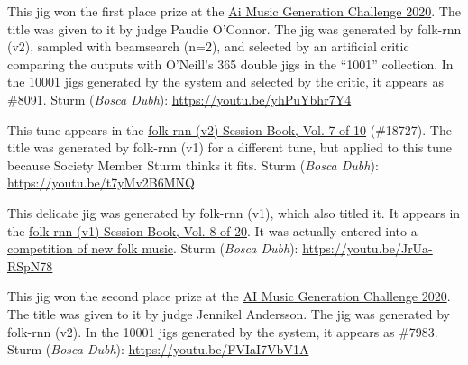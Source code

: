 \documentclass[a4paper,notitlepage,twoside]{book}
\begin{document}
{}
  
\hypertarget{jig:Aiman}{}
This jig won the first place prize at the 
\href{https://highnoongmt.wordpress.com/2020/11/20/the-ai-music-generation-challenge-2020-summary-and-results/}{Ai Music Generation Challenge 2020}.
The title was given to it by judge Paudie O'Connor.
The jig was generated by folk-rnn (v2), sampled with beamsearch (n=2),
and selected by an artificial critic comparing the outputs
with O'Neill's 365 double jigs in the ``1001'' collection.
In the 10001 jigs generated by the system and selected by the critic,
it appears as \#8091.
Sturm ({\em Bosca Dubh}): \url{https://youtu.be/yhPuYbhr7Y4}
  
{}
  
\hypertarget{jig:WoldenSailor}{}
This tune appears in the \href{https://highnoongmt.wordpress.com/2018/01/05/volumes-1-20-of-folk-rnn-v1-transcriptions}{folk-rnn (v2) Session Book, Vol. 7 of 10} (\#18727).
The title was generated by folk-rnn (v1) for a different tune, 
but applied to this tune because Society Member Sturm thinks it fits.
Sturm ({\em Bosca Dubh}): \url{https://youtu.be/t7yMv2B6MNQ}
  
{}
  
\hypertarget{jig:RellusTurnpipe}{}
This delicate jig was generated by folk-rnn (v1), which also titled it.
It appears in the \href{https://highnoongmt.wordpress.com/2018/01/05/volumes-1-20-of-folk-rnn-v1-transcriptions}{folk-rnn (v1) Session Book, Vol. 8 of 20}.
It was actually entered into a \href{https://www.stallet.st/sv/latskrivartavling}{competition of new folk music}.
Sturm ({\em Bosca Dubh}): \url{https://youtu.be/JrUa-RSpN78}

{}
  
\hypertarget{jig:LonesomeFairy}{}
This jig won the second place prize at the 
\href{https://highnoongmt.wordpress.com/2020/11/20/the-ai-music-generation-challenge-2020-summary-and-results/}{AI Music Generation Challenge 2020}.
The title was given to it by judge Jennikel Andersson.
The jig was generated by folk-rnn (v2).
In the 10001 jigs generated by the system,
it appears as \#7983.
Sturm ({\em Bosca Dubh}): \url{https://youtu.be/FVIaI7VbV1A}
\end{document}
